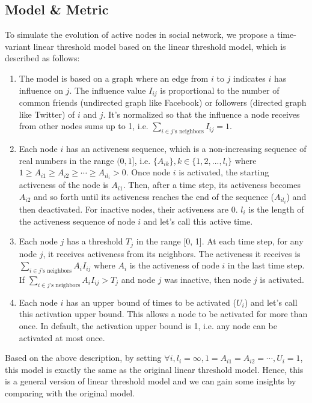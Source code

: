 \documentclass{article}
\begin{document}
\subsection{Model \& Metric}
To simulate the evolution of active nodes in social network, we propose a time-variant linear threshold model based on the linear threshold model, which is described as follows:

\begin{enumerate}
\item The model is based on a graph where an edge from $i$ to $j$ indicates $i$ has influence on $j$. The influence value $I_{ij}$ is proportional to the number of common friends (undirected graph like Facebook) or followers (directed graph like Twitter) of $i$ and $j$. It's normalized so that the influence a node receives from other nodes sums up to 1, i.e. $\sum_{i \in j\text{'s neighbors}} I_{ij} = 1$.

\item Each node $i$ has an activeness sequence, which is a non-increasing sequence of real numbers in the range $(0, 1]$, i.e. $\{A_{ik}\}, k \in \{1, 2, ..., l_i\}$ where $1 \geq A_{i1} \geq A_{i2} \geq \cdots \geq A_{il_i} > 0$. Once node $i$ is activated, the starting activeness of the node is $A_{i1}$. Then, after a time step, its activeness becomes $A_{i2}$ and so forth until its activeness reaches the end of the sequence ($A_{il_i}$) and then deactivated. For inactive nodes, their activeness are 0. $l_i$ is the length of the activeness sequence of node $i$ and let's call this active time.

\item Each node $j$ has a threshold $T_j$ in the range [0, 1].  At each time step, for any node $j$, it receives activeness from its neighbors. The activeness it receives is $\sum_{i \in j\text{'s neighbors}} A_iI_{ij}$ where $A_i$ is the activeness of node $i$ in the last time step. If $\sum_{i \in j\text{'s neighbors}} A_iI_{ij} > T_j$ and node $j$ was inactive, then node $j$ is activated.

\item Each node $i$ has an upper bound of times to be activated ($U_i$) and let's call this activation upper bound. This allows a node to be activated for more than once. In default, the activation upper bound is 1, i.e. any node can be activated at most once.
\end{enumerate}

Based on the above description, by setting $\forall i, l_i = \infty, 1 = A_{i1} = A_{i2} = \cdots, U_i = 1$, this model is exactly the same as the original linear threshold model. Hence, this is a general version of linear threshold model and we can gain some insights by comparing with the original model.
\end{document}
